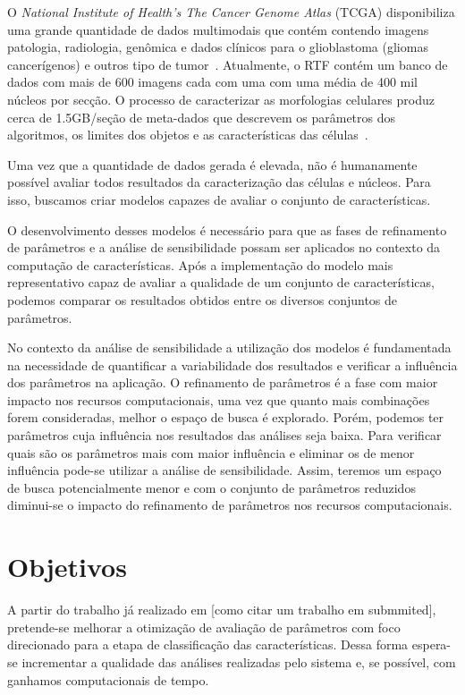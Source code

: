 \documentclass[a4paper,10pt]{article}
\begin{document}
O \textit{National Institute of Health’s The Cancer Genome Atlas} (TCGA) disponibiliza uma grande quantidade de dados multimodais que contém contendo imagens patologia, radiologia, genômica e dados clínicos para o glioblastoma (gliomas cancerígenos) e outros tipo de tumor~\cite{mclendon2008comprehensive}. Atualmente, o RTF contém um banco de dados com mais de 600 imagens cada com uma com uma média de 400 mil núcleos por secção. O processo de caracterizar as morfologias celulares produz cerca de 1.5GB/seção de meta-dados que descrevem os parâmetros dos algoritmos, os limites dos objetos e as características das células~\cite{cooper2011morphological}.

Uma vez que a quantidade de dados gerada é elevada, não é humanamente possível avaliar todos resultados da caracterização das células e núcleos. Para isso, buscamos criar modelos capazes de avaliar o conjunto de características.

O desenvolvimento desses modelos é necessário para que as fases de refinamento de parâmetros e a análise de sensibilidade possam ser aplicados no contexto da computação de características. Após a implementação do modelo mais representativo capaz de avaliar a qualidade de um conjunto de características, podemos comparar os resultados obtidos entre os diversos conjuntos de parâmetros. 

No contexto da análise de sensibilidade a utilização dos modelos é fundamentada na necessidade de quantificar a variabilidade dos resultados e verificar a influência dos parâmetros na aplicação. O refinamento de parâmetros é a fase com maior impacto nos recursos computacionais, uma vez que quanto mais combinações forem consideradas, melhor o espaço de busca é explorado. Porém, podemos ter parâmetros cuja influência nos resultados das análises seja baixa. Para verificar quais são os parâmetros mais com maior influência e eliminar os de menor influência pode-se utilizar a análise de sensibilidade. Assim, teremos um espaço de busca potencialmente menor e com o conjunto de parâmetros reduzidos diminui-se o impacto do refinamento de parâmetros nos recursos computacionais.

\section{Objetivos}

A partir do trabalho já realizado em [como citar um trabalho em submmited], pretende-se melhorar a otimização de avaliação de parâmetros com foco direcionado para a etapa de classificação das características. Dessa forma espera-se incrementar a qualidade das análises realizadas pelo sistema e, se possível, com ganhamos computacionais de tempo.
\end{document}
